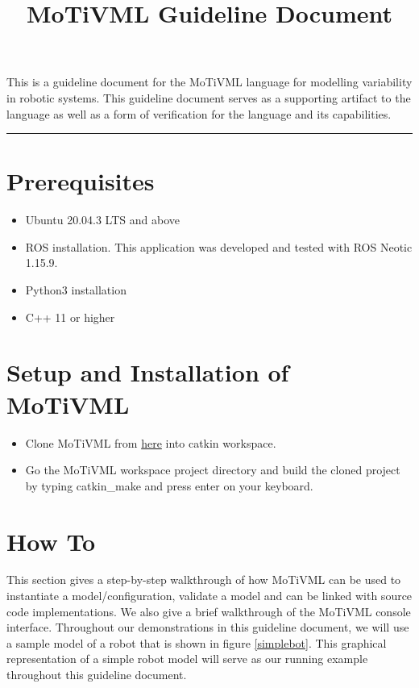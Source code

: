 \documentclass{article}
\title{MoTiVML Guideline Document}
\author{}
\date{}
\begin{document}
\maketitle
This is a guideline document for the MoTiVML language for modelling variability in robotic systems. This guideline document serves as a supporting artifact to the language as well as a form of verification for the language and its capabilities.

\noindent\rule{17cm}{0.4pt}

\label{guide:docs}
\section{Prerequisites}
    \begin{itemize}
        \item Ubuntu 20.04.3 LTS and above
        \item ROS installation. This application was developed and tested with ROS Neotic 1.15.9.
        \item Python3 installation
        \item C++ 11 or higher
    \end{itemize}

\section{Setup and Installation of MoTiVML}
\begin{itemize}
    \item Clone MoTiVML from \href{https://github.com/SergioGarG/sera-extension}{here} into catkin workspace.
    \item Go the MoTiVML workspace project directory and build the cloned project by typing catkin\_make and press enter on your keyboard.
\end{itemize}

\section{How To}
This section gives a step-by-step walkthrough of how MoTiVML can be used to instantiate a model/configuration, validate a model and can be linked with source code implementations. We also give a brief walkthrough of the MoTiVML console interface. Throughout our demonstrations in this guideline document, we will use a sample model of a robot that is shown in figure \ref{simplebot}. This graphical representation of a simple robot model will serve as our running example throughout this guideline document.
\end{document}
